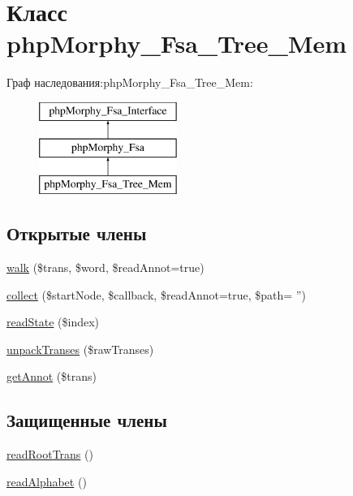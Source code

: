 \hypertarget{classphpMorphy__Fsa__Tree__Mem}{
\section{Класс phpMorphy\_\-Fsa\_\-Tree\_\-Mem}
\label{classphpMorphy__Fsa__Tree__Mem}
}
Граф наследования:phpMorphy\_\-Fsa\_\-Tree\_\-Mem:\begin{figure}[H]
\begin{center}
\leavevmode
\includegraphics[height=3.000000cm]{classphpMorphy__Fsa__Tree__Mem}
\end{center}
\end{figure}
\subsection*{Открытые члены}
\begin{DoxyCompactItemize}
\item 
\hyperlink{classphpMorphy__Fsa__Tree__Mem_a668d55a99a2f866173811f85a1b278c1}{walk} (\$trans, \$word, \$readAnnot=true)
\item 
\hyperlink{classphpMorphy__Fsa__Tree__Mem_a455f1a304ae13cac2fd956466364a2e4}{collect} (\$startNode, \$callback, \$readAnnot=true, \$path= '')
\item 
\hyperlink{classphpMorphy__Fsa__Tree__Mem_ab8f68a9eb5874f8ee254248a654f9776}{readState} (\$index)
\item 
\hyperlink{classphpMorphy__Fsa__Tree__Mem_a239c3b489fde8d245315756c8f2af8e6}{unpackTranses} (\$rawTranses)
\item 
\hyperlink{classphpMorphy__Fsa__Tree__Mem_a81511a132fe66989384992a7beec6a0c}{getAnnot} (\$trans)
\end{DoxyCompactItemize}
\subsection*{Защищенные члены}
\begin{DoxyCompactItemize}
\item 
\hyperlink{classphpMorphy__Fsa__Tree__Mem_a3cca131f8aa0d85fcab43ffc2889d6e2}{readRootTrans} ()
\item 
\hyperlink{classphpMorphy__Fsa__Tree__Mem_a71ef7b5a6918f620f4dd0a86dcc23e7f}{readAlphabet} ()
\end{DoxyCompactItemize}


